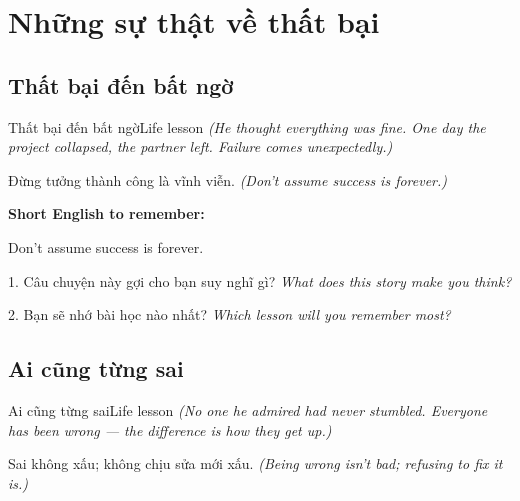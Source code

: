 \chapter{Những sự thật về thất bại}


\section{Thất bại đến bất ngờ}
\begin{truyen}{Thất bại đến bất ngờ}{Life lesson}
\textit{(He thought everything was fine. One day the project collapsed, the partner left. Failure comes unexpectedly.)}
\end{truyen}

\begin{baihoc}
Đừng tưởng thành công là vĩnh viễn.
\textit{(Don't assume success is forever.)}
\end{baihoc}

\begin{ghinhoanh}
\textbf{Short English to remember:}

Don't assume success is forever.

\end{ghinhoanh}

\begin{tuhocnhanh}
1. Câu chuyện này gợi cho bạn suy nghĩ gì? \textit{What does this story make you think?}

2. Bạn sẽ nhớ bài học nào nhất? \textit{Which lesson will you remember most?}
\end{tuhocnhanh}
\ngancach


\section{Ai cũng từng sai}
\begin{truyen}{Ai cũng từng sai}{Life lesson}
\textit{(No one he admired had never stumbled. Everyone has been wrong — the difference is how they get up.)}
\end{truyen}

\begin{baihoc}
Sai không xấu; không chịu sửa mới xấu.
\textit{(Being wrong isn't bad; refusing to fix it is.)}
\end{baihoc}

